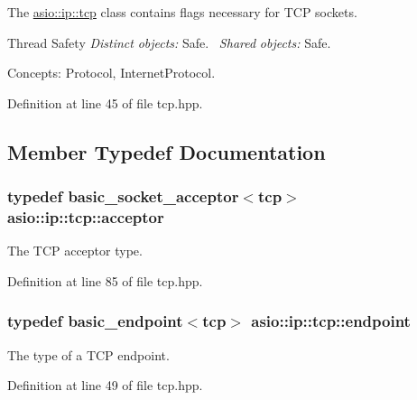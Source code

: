 The \hyperlink{classasio_1_1ip_1_1tcp}{asio\+::ip\+::tcp} class contains flags necessary for T\+C\+P sockets.

\begin{DoxyParagraph}{Thread Safety}
{\itshape Distinct} {\itshape objects\+:} Safe.~\newline
{\itshape Shared} {\itshape objects\+:} Safe.
\end{DoxyParagraph}
\begin{DoxyParagraph}{Concepts\+:}
Protocol, Internet\+Protocol. 
\end{DoxyParagraph}


Definition at line 45 of file tcp.\+hpp.



\subsection{Member Typedef Documentation}
\hypertarget{classasio_1_1ip_1_1tcp_a09a6c28b61af7d9d7680c03ba5062f67}{}
\subsubsection[{acceptor}]{\setlength{\rightskip}{0pt plus 5cm}typedef {\bf basic\+\_\+socket\+\_\+acceptor}$<${\bf tcp}$>$ {\bf asio\+::ip\+::tcp\+::acceptor}}\label{classasio_1_1ip_1_1tcp_a09a6c28b61af7d9d7680c03ba5062f67}


The T\+C\+P acceptor type. 



Definition at line 85 of file tcp.\+hpp.

\hypertarget{classasio_1_1ip_1_1tcp_ad8c036bc6e1ae9b77b3beca871933de2}{}
\subsubsection[{endpoint}]{\setlength{\rightskip}{0pt plus 5cm}typedef {\bf basic\+\_\+endpoint}$<${\bf tcp}$>$ {\bf asio\+::ip\+::tcp\+::endpoint}}\label{classasio_1_1ip_1_1tcp_ad8c036bc6e1ae9b77b3beca871933de2}


The type of a T\+C\+P endpoint. 



Definition at line 49 of file tcp.\+hpp.

